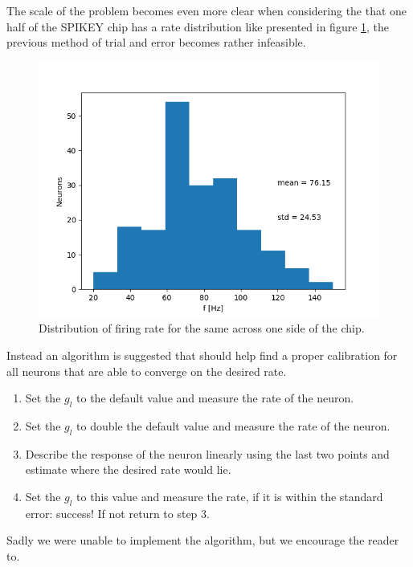 \documentclass[10pt,a4paper]{article}
\begin{document}
The scale of the problem becomes even more clear when considering the that one
half of the SPIKEY chip has a rate distribution like presented in figure
\ref{fig:distribution}, the previous method of trial and error becomes rather
infeasible.

\begin{figure}[ht]
    \centering
    \includegraphics[width=\textwidth]{figures/rate-distribution.png}
    \caption{Distribution of firing rate for the same across one side of the
    chip.}
    \label{fig:distribution}
\end{figure}

Instead an algorithm is suggested that should help find a proper calibration for
all neurons that are able to converge on the desired rate.
\begin{enumerate}
    \item Set the $g_l$ to the default value and measure the rate of the neuron.
    \item Set the $g_l$ to double the default value and measure the rate of the
        neuron.
    \item Describe the response of the neuron linearly using the last two
        points and estimate where the desired rate would lie.
    \item Set the $g_l$ to this value and measure the rate, if it is within the
        standard error: success! If not return to step 3.
\end{enumerate}
Sadly we were unable to implement the algorithm, but we encourage the reader
to.
\end{document}
